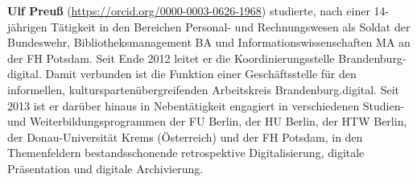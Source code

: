 \documentclass[a4paper,
fontsize=11pt,
oneside,
numbers=noperiodatend,
parskip=half-,
bibliography=totoc,
final
]{scrartcl}
\begin{document}
\textbf{Ulf Preuß} (\url{https://orcid.org/0000-0003-0626-1968}) studierte, nach einer
14-jährigen Tätigkeit in den Bereichen Personal- und Rechnungswesen
als Soldat der Bundeswehr, Bibliotheksmanagement BA und
Informationswissenschaften MA an der FH Potsdam. Seit Ende 2012 leitet
er die Koordinierungsstelle Brandenburg-digital. Damit verbunden ist die
Funktion einer Geschäftsstelle für den informellen,
kulturspartenübergreifenden Arbeitskreis Brandenburg.digital. Seit 2013
ist er darüber hinaus in Nebentätigkeit engagiert in verschiedenen
Studien- und Weiterbildungsprogrammen der FU Berlin, der HU Berlin, der
HTW Berlin, der Donau-Universität Krems (Österreich) und der FH Potsdam,
in den Themenfeldern bestandsschonende retrospektive Digitalisierung,
digitale Präsentation und digitale Archivierung.
\end{document}
